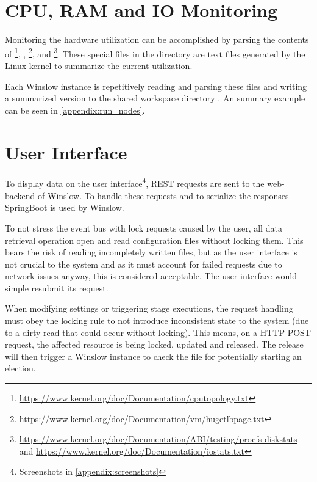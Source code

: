 \section{CPU, RAM and IO Monitoring}
\label{design:monitor_resources}

Monitoring the hardware utilization can be accomplished by parsing the contents of \footnote{\url{https://www.kernel.org/doc/Documentation/cputopology.txt}}, , \footnote{\url{https://www.kernel.org/doc/Documentation/vm/hugetlbpage.txt}},  and \linebreak{}\footnote{\url{https://www.kernel.org/doc/Documentation/ABI/testing/procfs-diskstats} and \url{https://www.kernel.org/doc/Documentation/iostats.txt}}.
These special files in the  directory are text files generated by the Linux kernel to summarize the current utilization\cite{linux:doc:proc}.

Each Winslow instance is repetitively reading and parsing these files and writing a summarized version to the shared workspace directory .
An summary example can be seen in \autoref{appendix:run_nodes}.

\section{User Interface}
\label{design:springboot}

To display data on the user interface\footnote{Screenshots in \autoref{appendix:screenshots}}, REST requests are sent to the web-backend of Winslow.
To handle these requests and to serialize the responses SpringBoot\cite{springboot} is used by Winslow.

To not stress the event bus with lock requests caused by the user, all data retrieval operation open and read configuration files without locking them.
This bears the risk of reading incompletely written files, but as the user interface is not crucial to the system and as it must account for failed requests due to network issues anyway, this is considered acceptable.
The user interface would simple resubmit its request.

When modifying settings or triggering stage executions, the request handling must obey the locking rule to not introduce inconsistent state to the system (due to a dirty read\cite[2]{berenson1995a} that could occur without locking).
This means, on a HTTP POST request, the affected resource is being locked, updated and released.
The release will then trigger a Winslow instance to check the file for potentially starting an election.


